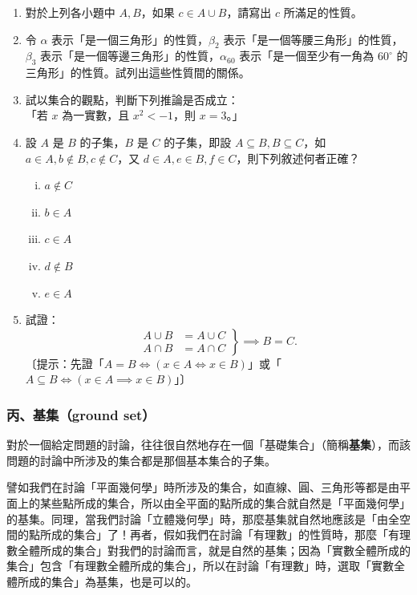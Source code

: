 \begin{enumerate}[1., leftmargin=2em]
\begin{enumerate}[(i)]
    \item $A = \{x \mid x \in \mathbb{R} \text{ 且 } ax^3 + bx^2 + cx + d = 0\}$，$B = \{x \mid x \in \mathbb{R} \text{ 且 } a'x^4 + b' = 0\}$（只須以語言敘述）。
  \end{enumerate}
  \item 對於上列各小題中 $A, B$，如果 $c \in A \cup B$，請寫出 $c$ 所滿足的性質。
  \item 令 $\alpha$ 表示「是一個三角形」的性質，$\beta_2$ 表示「是一個等腰三角形」的性質，$\beta_3$ 表示「是一個等邊三角形」的性質，$\alpha_{60}$ 表示「是一個至少有一角為 $60^\circ$ 的三角形」的性質。試列出這些性質間的關係。
  \item 試以集合的觀點，判斷下列推論是否成立：\\
  「若 $x$ 為一實數，且 $x^2 < -1$，則 $x = 3$。」
  \item 設 $A$ 是 $B$ 的子集，$B$ 是 $C$ 的子集，即設 $A \subseteq B, B \subseteq C$，如 $a \in A, b \notin B, c \notin C$，又 $d \in A, e \in B, f \in C$，則下列敘述何者正確？
  \begin{enumerate}[(i)]
    \item $a \notin C$
    \item $b \in A$
    \item $c \in A$
    \item $d \notin B$
    \item $e \in A$
  \end{enumerate}
  \item 試證：
  \begin{equation*}
    \left.
    \begin{aligned}
      A \cup B &= A \cup C \\
      A \cap B &= A \cap C
    \end{aligned}
    \right\} \implies B = C.
  \end{equation*}
  〔提示：先證「$A = B \iff (x \in A \iff x \in B)$」或「$A \subseteq B \iff (x \in A \implies x \in B)$」〕
\end{enumerate}

\subsubsection*{丙、基集（ground set）}\label{subsec:2-4-c}

對於一個給定問題的討論，往往很自然地存在一個「基礎集合」（簡稱\textbf{基集}），而該問題的討論中所涉及的集合都是那個基本集合的子集。

譬如我們在討論「平面幾何學」時所涉及的集合，如直線、圓、三角形等都是由平面上的某些點所成的集合，所以由全平面的點所成的集合就自然是「平面幾何學」的基集。同理，當我們討論「立體幾何學」時，那麼基集就自然地應該是「由全空間的點所成的集合」了！再者，假如我們在討論「有理數」的性質時，那麼「有理數全體所成的集合」對我們的討論而言，就是自然的基集；因為「實數全體所成的集合」包含「有理數全體所成的集合」，所以在討論「有理數」時，選取「實數全體所成的集合」為基集，也是可以的。

